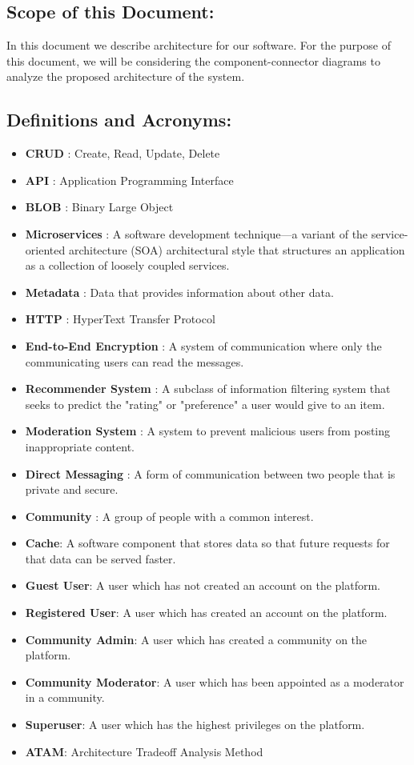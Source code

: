 \documentclass[11pt]{article}
\begin{document}
\subsection{Scope of this Document:}
In this document we describe architecture for our software. For the purpose of this document, we will be considering the component-connector diagrams to analyze the proposed architecture of the system.
\subsection{Definitions and Acronyms:}
\begin{itemize}
    \item \textbf{CRUD} : Create, Read, Update, Delete
    \item \textbf{API} : Application Programming Interface
    \item \textbf{BLOB} : Binary Large Object
    \item \textbf{Microservices} : A software development technique—a variant of the service-oriented architecture (SOA) architectural style that structures an application as a collection of loosely coupled services.
    \item \textbf{Metadata} : Data that provides information about other data.
    \item \textbf{HTTP} : HyperText Transfer Protocol
    \item \textbf{End-to-End Encryption} : A system of communication where only the communicating users can read the messages.
    \item \textbf{Recommender System} : A subclass of information filtering system that seeks to predict the "rating" or "preference" a user would give to an item.
    \item \textbf{Moderation System} : A system to prevent malicious users from posting inappropriate content.
    \item \textbf{Direct Messaging} : A form of communication between two people that is private and secure.
    \item \textbf{Community} : A group of people with a common interest.
    \item \textbf{Cache}: A software component that stores data so that future requests for that data can be served faster.
    \item \textbf{Guest User}: A user which has not created an account on the platform.
    \item \textbf{Registered User}: A user which has created an account on the platform.
    \item \textbf{Community Admin}: A user which has created a community on the platform.
    \item \textbf{Community Moderator}: A user which has been appointed as a moderator in a community.
    \item \textbf{Superuser}: A user which has the highest privileges on the platform.
    \item \textbf{ATAM}: Architecture Tradeoff Analysis Method
\end{itemize}
\end{document}
